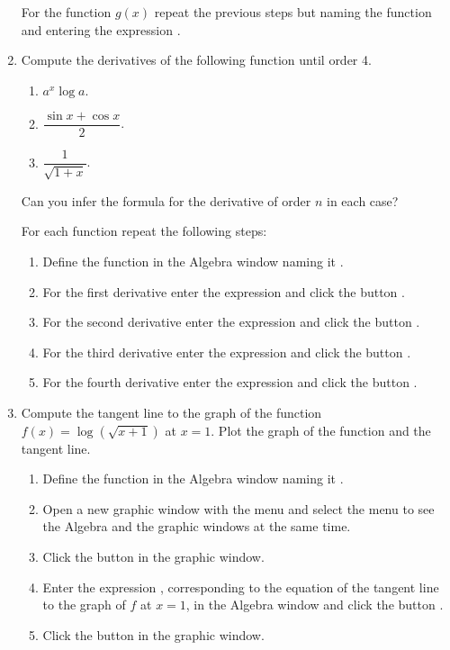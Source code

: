 \begin{enumerate}[leftmargin=*]
\begin{indication}
For the function $g(x)$ repeat the previous steps but naming the function  and entering the expression .
\end{indication}


\item Compute the derivatives of the following function until order 4.
\begin{enumerate}
\item $a^x\log a$.
\item $\dfrac{\sin x +\cos x}{2}$.
\item $\dfrac{1}{\sqrt{1+x}}$.
\end{enumerate}

Can you infer the formula for the derivative of order $n$ in each case?

\begin{indication}
For each function repeat the following steps:
\begin{enumerate}
\item Define the function in the Algebra window naming it .
\item For the first derivative enter the expression  and click the button .
\item For the second derivative enter the expression  and click the button .
\item For the third derivative enter the expression  and click the button .
\item For the fourth derivative enter the expression  and click the button .
\end{enumerate}
\end{indication}


\item Compute the tangent line to the graph of the function $f(x)=\log(\sqrt{x+1})$ at $x=1$.
Plot the graph of the function and the tangent line. 
\begin{indication}
\begin{enumerate}
\item Define the function in the Algebra window naming it .
\item Open a new graphic window with the menu  and select the menu  to see the Algebra and the graphic windows at the same time.  
\item Click the button  in the graphic window.
\item Enter the expression , corresponding to the equation of the tangent line to the graph of $f$ at $x=1$, in the Algebra window and click the button .
\item Click the button  in the graphic window.
\end{enumerate}
\end{indication}


\end{enumerate}
